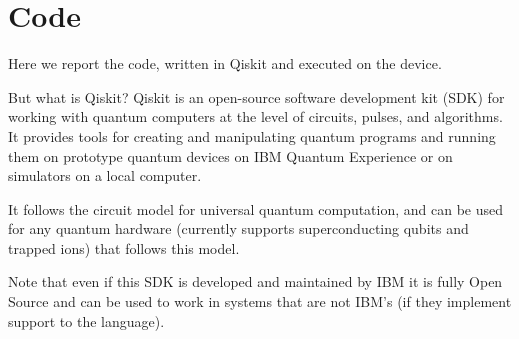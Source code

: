 \chapter{Code}\label{ch:code}
Here we report the code, written in Qiskit and executed on the device.

But what is Qiskit?
Qiskit is an open-source software development kit (SDK) for working with quantum computers at the level of circuits, pulses, and algorithms. It provides tools for creating and manipulating quantum programs and running them on prototype quantum devices on IBM Quantum Experience or on simulators on a local computer. 

It follows the circuit model for universal quantum computation, and can be used for any quantum hardware (currently supports superconducting qubits and trapped ions) that follows this model. 

Note that even if this SDK is developed and maintained by IBM it is fully Open Source and can be used to work in systems that are not IBM's (if they implement support to the language).


